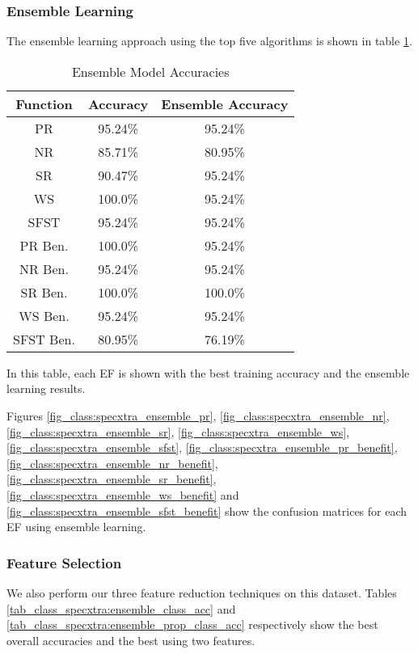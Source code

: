 \documentclass[12pt,letterpaper]{article}
\begin{document}
\subsubsection{Ensemble Learning}
The ensemble learning approach using the top five algorithms is shown in table \ref{tab_specxtra:class_ensemble}.
\begin{table}[H]
\centering
\begin{tabular}{|c|c|c|}
\hline
\textbf{Function} & \textbf{Accuracy} & \textbf{Ensemble Accuracy} \\
\hline
PR      & 95.24\% & 95.24\% \\
\hline
NR      & 85.71\% & 80.95\%\\
\hline
SR      & 90.47\% & 95.24\%\\
\hline
WS      & 100.0\% & 95.24\%\\
\hline
SFST    & 95.24\% & 95.24\%\\
\hline
PR Ben. & 100.0\% & 95.24\%\\
\hline
NR Ben. & 95.24\% & 95.24\%\\
\hline
SR Ben. & 100.0\% & 100.0\%\\
\hline
WS Ben. & 95.24\% & 95.24\%\\
\hline
SFST Ben. & 80.95\% & 76.19\%\\
\hline
\end{tabular}
\caption{Ensemble Model Accuracies}
\label{tab_specxtra:class_ensemble}
\end{table}
In this table, each \ac{EF} is shown with the best training accuracy and the ensemble learning results.

Figures \ref{fig_class:specxtra_ensemble_pr}, \ref{fig_class:specxtra_ensemble_nr}, \ref{fig_class:specxtra_ensemble_sr}, \ref{fig_class:specxtra_ensemble_ws}, \ref{fig_class:specxtra_ensemble_sfst}, \ref{fig_class:specxtra_ensemble_pr_benefit}, \ref{fig_class:specxtra_ensemble_nr_benefit}, \ref{fig_class:specxtra_ensemble_sr_benefit}, \ref{fig_class:specxtra_ensemble_ws_benefit} and \ref{fig_class:specxtra_ensemble_sfst_benefit} show the confusion matrices for each \ac{EF} using ensemble learning.

\subsubsection{Feature Selection}
We also perform our three feature reduction techniques on this dataset.
Tables \ref{tab_class_specxtra:ensemble_class_acc} and \ref{tab_class_specxtra:ensemble_prop_class_acc} respectively show the best overall accuracies and the best using two features.
\end{document}
